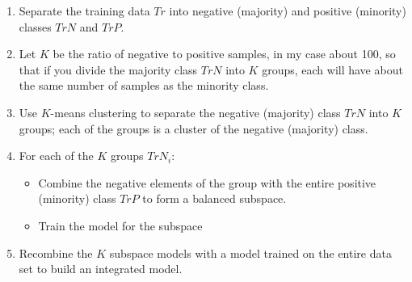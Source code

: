 \begin{enumerate}
	\item Separate the training data $Tr$ into negative (majority) and positive (minority) classes $TrN$ and $TrP$.
	\item Let $K$ be the ratio of negative to positive samples, in my case about 100, so that if you divide the majority class $TrN$ into $K$ groups, each will have about the same number of samples as the minority class.
	\item Use $K$-means clustering to separate the negative (majority) class $TrN$ into $K$ groups; each of the groups is a cluster of the negative (majority) class.
	\item For each of the $K$ groups $TrN_i$:
	\begin{itemize}
		\item Combine the negative elements of the group with the entire positive (minority) class $TrP$ to form a balanced subspace.  
		\item Train the model for the subspace
	\end{itemize}
	\item Recombine the $K$ subspace models with a model trained on the entire data set to build an integrated model.
\end{enumerate}
